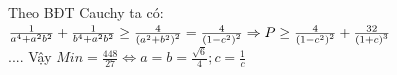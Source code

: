 \hda 
Theo BĐT Cauchy ta có: $\frac{1}{a^{4}+a^{2}b^{2}}+\frac{1}{b^{4}+a^{2}b^{2}}\geq \frac{4}{\left ( a^{2}+b^{2} \right )^{2}}= \frac{4}{\left ( 1-c^{2} \right )^{2}}\\
\Rightarrow P\geq \frac{4}{\left ( 1-c^{2} \right )^{2}}+\frac{32}{\left ( 1+c \right )^{3}}$\\
....
Vậy ${Min}=\frac{448}{27}\Leftrightarrow a=b=\frac{\sqrt{6}}{4};c=\frac{1}{c}$